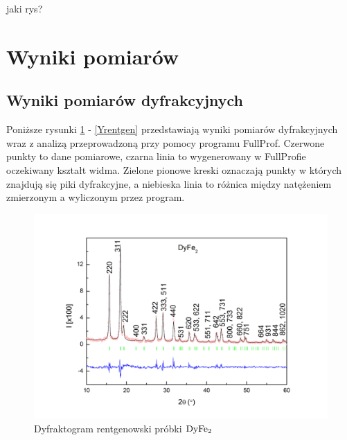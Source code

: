 \documentclass[a4paper,12pt]{article}
\numberwithin{equation}{section}
\newcommand{\nit}[1]{\textnormal{#1}}
\begin{document}
jaki rys?






\section{Wyniki pomiarów}

\subsection{Wyniki pomiarów dyfrakcyjnych}

Poniższe rysunki \ref{Dyrentgen} - \ref{Yrentgen} przedstawiają wyniki pomiarów dyfrakcyjnych wraz z analizą 
przeprowadzoną przy pomocy programu FullProf. Czerwone punkty to dane pomiarowe, czarna linia to wygenerowany 
w FullProfie oczekiwany kształt widma. Zielone pionowe kreski oznaczają punkty w których znajdują się piki dyfrakcyjne, 
a niebieska linia to różnica między natężeniem zmierzonym a wyliczonym przez program.

\newpage
{}

\newpage
\begin{figure}
  \centering
  \includegraphics[width=0.85\linewidth]{../img/dif/DyFe2rentgen}
  \caption{Dyfraktogram rentgenowski próbki $\nit{Dy}\nit{Fe}_2$}
  \label{Dyrentgen}
\end{figure}
\end{document}
